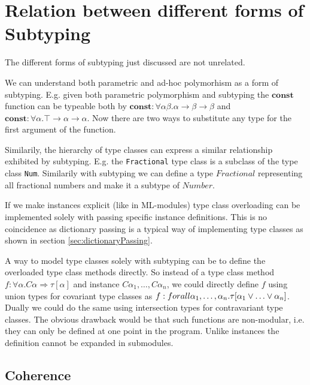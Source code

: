 \cite{wadlerblott}

\section{Relation between different forms of Subtyping}\label{sec:relations}

The different forms of subtyping just discussed are not unrelated.

We can understand both parametric and ad-hoc polymorhism as a form of subtyping.
E.g. given both parametric polymorphism and subtyping the $\mathbf{const}$ function can be typeable both by
$\mathbf{const} : \forall \alpha \beta. \alpha \to \beta \to \beta$ and $\mathbf{const} : \forall \alpha. \top \to \alpha \to \alpha$.
Now there are two ways to substitute any type for the first argument of the function.

Similarily, the hierarchy of type classes can express a similar relationship exhibited by subtyping.
E.g. the \texttt{Fractional} type class is a subclass of the type class \texttt{Num}.
Similarily with subtyping we can define a type $\mathit{Fractional}$ representing all fractional numbers and make it a subtype of $\mathit{Number}$.

If we make instances explicit (like in ML-modules) type class overloading can be implemented solely with passing specific instance definitions.
This is no coincidence as dictionary passing is a typical way of implementing type classes as shown in section \ref{sec:dictionaryPassing}.

A way to model type classes solely with subtyping can be to define the overloaded type class methods directly.
So instead of a type class method $f : \forall \alpha. C \alpha \Rightarrow \tau[\alpha]$ and instance $C \alpha_1, \dots, C \alpha_n$,
we could directly define $f$ using union types for covariant type classes as $f : forall \alpha_1,\dots,\alpha_n. \tau[\alpha_1 \join \dots \join \alpha_n]$.
Dually we could do the same using intersection types for contravariant type classes.
The obvious drawback would be that such functions are non-modular, i.e. they can only be defined at one point in the program.
Unlike instances the definition cannot be expanded in submodules.

\subsection{Coherence}\label{sec:coherence}

